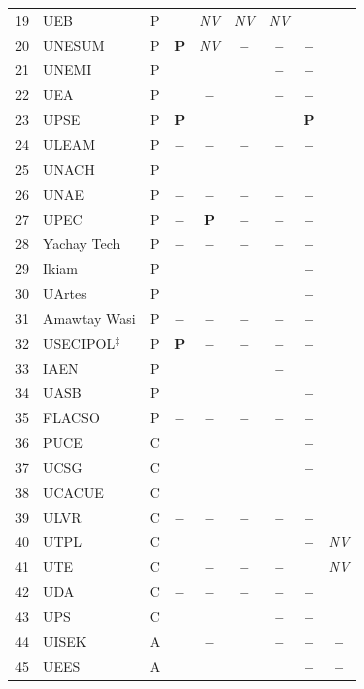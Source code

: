 \documentclass[pdflatex,sn-basic,Numbered,iicol]{sn-jnl}
\newcommand{\si}{\ding{51}}
\newcommand{\no}{\textcolor{gris}{\textbf{--}}}
\newcommand{\pc}{\textbf{P}}
\newcommand{\nv}{\textsl{\footnotesize NV}}
\theoremstyle{thmstyleone}
\theoremstyle{thmstyletwo}
\theoremstyle{thmstylethree}
\begin{document}
\begin{appendices}
\begin{longtable}{@{}r l c c c c c c c@{}}
			19 & UEB & P & \si & \nv & \nv & \nv & \si & \si \\
			20 & UNESUM & P & \pc & \nv & \no & \no & \no & \si \\
			21 & UNEMI & P & \si & \si & \si & \no & \no & \si \\
			22 & UEA & P & \si & \no & \si & \no & \no & \si \\
			23 & UPSE & P & \pc & \si & \si & \si & \pc & \si \\
			24 & ULEAM & P & \no & \no & \no & \no & \no & \si \\
			25 & UNACH & P & \si & \si & \si & \si & \si & \si \\
			26 & UNAE & P & \no & \no & \no & \no & \no & \si \\
			27 & UPEC & P & \no & \pc & \no & \no & \no & \si \\
			28 & Yachay Tech & P & \no & \no & \no & \no & \no & \si \\
			29 & Ikiam & P & \si & \si & \si & \si & \no & \si \\
			30 & UArtes & P & \si & \si & \si & \si & \no & \si \\
			31 & Amawtay Wasi & P & \no & \no & \no & \no & \no & \si \\
			32 & USECIPOL$^\ddagger$ & P & \pc & \no & \no & \no & \no & \si \\
			33 & IAEN & P & \si & \si & \si & \no & \si & \si \\
			34 & UASB & P & \si & \si & \si & \si & \no & \si \\
			35 & FLACSO & P & \no & \no & \no & \no & \no & \si \\
			36 & PUCE & C & \si & \si & \si & \si & \no & \si \\
			37 & UCSG & C & \si & \si & \si & \si & \no & \si \\
			38 & UCACUE & C & \si & \si & \si & \si & \si & \si \\
			39 & ULVR & C & \no & \no & \no & \no & \no & \si \\
			40 & UTPL & C & \si & \si & \si & \si & \no & \nv \\
			41 & UTE & C & \si & \no & \no & \no & \si & \nv \\
			42 & UDA & C & \no & \no & \no & \no & \no & \si \\
			43 & UPS & C & \si & \si & \si & \no & \no & \si \\
			44 & UISEK & A & \si & \no & \si & \no & \no & \no \\
			45 & UEES & A & \si & \si & \si & \si & \no & \no \\

\end{longtable}
\end{appendices}
\end{document}

